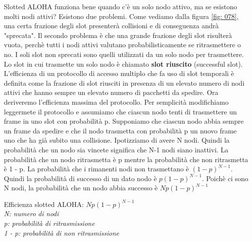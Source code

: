 \documentclass[11pt,a4paper]{article}
\begin{document}
Slotted ALOHA funziona bene quando c'è un solo nodo attivo, ma se esistono molti nodi attivi? Esistono due problemi. Come vediamo dalla figura \ref{fig: 078}, una certa frazione degli slot presenterà collisioni e di conseguenza andrà "sprecata". Il secondo problema è che una grande frazione degli slot risulterà vuota, perchè tutti i nodi attivi valutano probabilisticamente se ritrasmettere o no. I soli slot non sprecati sono quelli utilizzati da un solo nodo per trasmettere. Lo slot in cui trasmette un solo nodo è chiamato \textbf{slot riuscito} (successful slot). L'efficienza di un protocollo di accesso multiplo che fa uso di slot temporali è definita come la frazione di slot riusciti in presenza di un elevato numero di nodi attivi che hanno sempre un elevato numero di pacchetti da spedire. Ora deriveremo l'efficienza massima del  protocollo. Per semplicità modifichiamo leggermete il protocollo e assumiamo che ciascun nodo tenti di trasmettere un frame in uno slot con probabilità p. Supponiamo che ciascun nodo abbia sempre un frame da spedire e che il nodo trasmetta con probabilità p un nuovo frame  uno che ha già subito una collisione. Ipotizziamo di avere N nodi. Quindi la probabilità che un nodo sia vincete significa che N-1 nodi siano inattivi. La probabilità che un nodo ritrasmetta è p mentre la probabilità che non ritrasmetta è 1 - p. La probabilità che i rimanenti nodi non trasmettano è $(1 - p)^{N - 1}$. Quindi la probabilità di successo di un dato nodo è $p(1 - p)^{N - 1}$. Poichè ci sono N nodi, la probabilità che un nodo abbia successo è $Np(1 - p)^{N - 1}$
\begin{center}
	Efficienza slotted ALOHA: $Np(1 - p)^{N - 1}$ \\
	\textit{N: numero di nodi \\
		p: probabilità di ritrasmissione \\
		1 - p: probabilità di non ritrasmissione}
\end{center}
\end{document}

